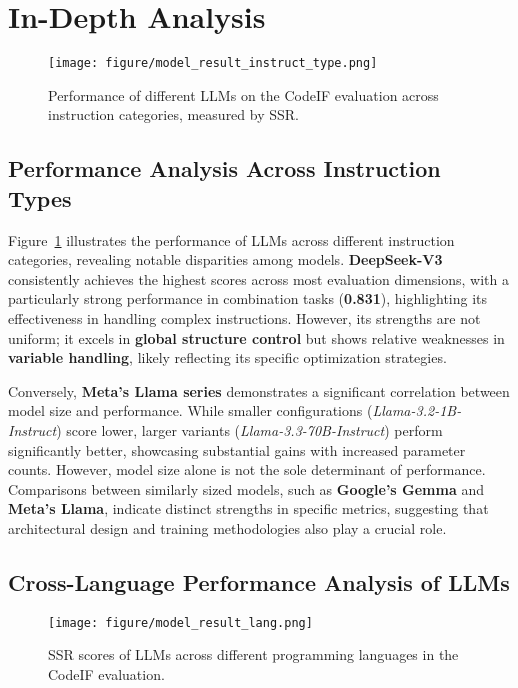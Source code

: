 \section{In-Depth Analysis}

\begin{figure}
    \centering
    \texttt{[image: figure/model\_result\_instruct\_type.png]}
    \caption{Performance of different LLMs on the CodeIF evaluation across instruction categories, measured by SSR.}
    \label{fig:model_result_instruct_type}
\end{figure}

\subsection{Performance Analysis Across Instruction Types}
Figure~\ref{fig:model_result_instruct_type} illustrates the performance of LLMs across different instruction categories, revealing notable disparities among models. \textbf{DeepSeek-V3} consistently achieves the highest scores across most evaluation dimensions, with a particularly strong performance in combination tasks (\textbf{0.831}), highlighting its effectiveness in handling complex instructions. However, its strengths are not uniform; it excels in \textbf{global structure control} but shows relative weaknesses in \textbf{variable handling}, likely reflecting its specific optimization strategies.

Conversely, \textbf{Meta's Llama series} demonstrates a significant correlation between model size and performance. While smaller configurations (\textit{Llama-3.2-1B-Instruct}) score lower, larger variants (\textit{Llama-3.3-70B-Instruct}) perform significantly better, showcasing substantial gains with increased parameter counts. However, model size alone is not the sole determinant of performance. Comparisons between similarly sized models, such as \textbf{Google's Gemma} and \textbf{Meta's Llama}, indicate distinct strengths in specific metrics, suggesting that architectural design and training methodologies also play a crucial role.

\subsection{Cross-Language Performance Analysis of LLMs}

\begin{figure*}
    \centering
    \texttt{[image: figure/model\_result\_lang.png]}
    \caption{SSR scores of LLMs across different programming languages in the CodeIF evaluation.}
    \label{fig:model_result_lang}
\end{figure*}

